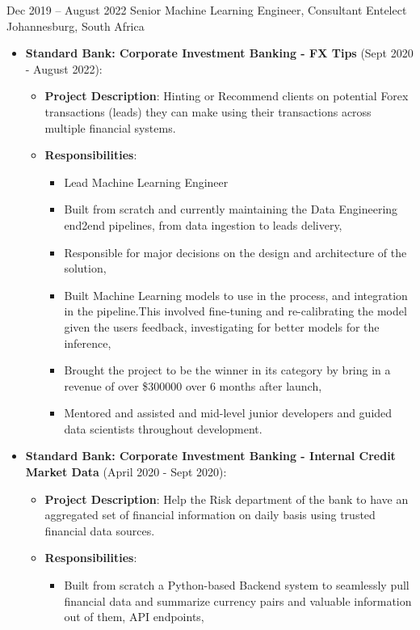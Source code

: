 \documentclass[11pt, letterpaper]{moderncv}        %
\begin{document}
\cventry
{Dec 2019 -- August 2022}
{Senior Machine Learning Engineer, Consultant}
{Entelect}
{Johannesburg, South Africa}
{}
{\begin{itemize}%
		\item \textbf{Standard Bank: Corporate Investment Banking - FX Tips} (Sept 2020 - August 2022): 
		\begin{itemize}
			\item \textbf{Project Description}: Hinting or Recommend clients on potential Forex transactions (leads) they can make using their transactions across multiple financial systems. 
			\item \textbf{Responsibilities}:
			\begin{itemize}
				\item Lead Machine Learning Engineer
				\item Built from scratch and currently maintaining the Data Engineering end2end pipelines, from data ingestion to leads delivery,
				\item Responsible for major decisions on the design and architecture of the solution,
				\item Built Machine Learning models to use in the process, and integration in the pipeline.This involved fine-tuning and re-calibrating the model given the users feedback, investigating for better models for the inference,
				\item Brought the project to be the winner in its category by bring in a revenue of over \$300000 over 6 months after launch,
				\item Mentored and assisted and mid-level junior developers and guided data scientists throughout development. 
		\end{itemize}
		\end{itemize}
		\item \textbf{Standard Bank: Corporate Investment Banking - Internal Credit Market Data} (April 2020 - Sept 2020): 
		\begin{itemize}
			\item \textbf{Project Description}: Help the Risk department of the bank to have an aggregated set of financial information on daily basis using trusted financial data sources.
			\item \textbf{Responsibilities}:
			\begin{itemize}
				\item Built from scratch a Python-based Backend system to seamlessly pull financial data and summarize currency pairs and valuable information out of them, API endpoints,

\end{itemize}
\end{itemize}
\end{itemize}}
\end{document}
